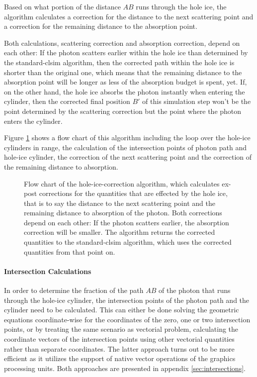 Based on what portion of the distance $AB$ runs through the hole ice, the algorithm calculates a correction for the distance to the next scattering point and a correction for the remaining distance to the absorption point.

Both calculations, scattering correction and absorption correction, depend on each other: If the photon scatters earlier within the hole ice than determined by the standard-clsim algorithm, then the corrected path within the hole ice is shorter than the original one, which means that the remaining distance to the absorption point will be longer as less of the absorption budget is spent, yet. If, on the other hand, the hole ice absorbs the photon instantly when entering the cylinder, then the corrected final position $B'$ of this simulation step won't be the point determined by the scattering correction but the point where the photon enters the cylinder.

Figure \ref{fig:bahxug7O} shows a flow chart of this algorithm including the loop over the hole-ice cylinders in range, the calculation of the intersection points of photon path and hole-ice cylinder, the correction of the next scattering point and the correction of the remaining distance to absorption.

\begin{figure}[htbp]
  \caption{Flow chart of the hole-ice-correction algorithm, which calculates ex-post corrections for the quantities that are effected by the hole ice, that is to say the distance to the next scattering point and the remaining distance to absorption of the photon. Both corrections depend on each other: If the photon scatters earlier, the absorption correction will be smaller. The algorithm returns the corrected quantities to the standard-clsim algorithm, which uses the corrected quantities from that point on.}
  \label{fig:bahxug7O}
\end{figure}

\paragraph{Intersection Calculations} In order to determine the fraction of the path $AB$ of the photon that runs through the hole-ice cylinder, the intersection points of the photon path and the cylinder need to be calculated. This can either be done solving the geometric equations coordinate-wise for the coordinates of the zero, one or two intersection points, or by treating the same scenario as vectorial problem, calculating the coordinate vectors of the intersection points using other vectorial quantities rather than separate coordinates. The latter approach turns out to be more efficient as it utilizes the support of native vector operations of the graphics processing units. Both approaches are presented in appendix \ref{sec:intersections}.

